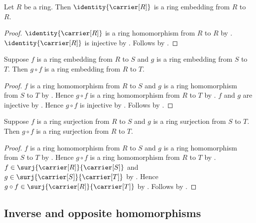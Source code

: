 \begin{proposition}\label{identity_ring_embedding}
    Let $R$ be a ring.
    Then $\identity{\carrier[R]}$ is a ring embedding from $R$ to $R$.
\end{proposition}
\begin{proof}
    $\identity{\carrier[R]}$ is a ring homomorphism from $R$ to $R$ by
        .
    $\identity{\carrier[R]}$ is injective by
        .
    Follows by .
\end{proof}

\begin{theorem}\label{ring_embedding_composition}
    Suppose $f$ is a ring embedding from $R$ to $S$ and
        $g$ is a ring embedding from $S$ to $T$.
    Then $g\circ f$ is a ring embedding from $R$ to $T$.
\end{theorem}
\begin{proof}
    $f$ is a ring homomorphism from $R$ to $S$ and
        $g$ is a ring homomorphism from $S$ to $T$ by
        .
    Hence $g\circ f$ is a ring homomorphism from $R$ to $T$ by
        .
    $f$ and $g$ are injective by .
    Hence $g\circ f$ is injective by .
    Follows by .
\end{proof}

\begin{theorem}\label{ring_surjection_composition}
    Suppose $f$ is a ring surjection from $R$ to $S$ and
        $g$ is a ring surjection from $S$ to $T$.
    Then $g\circ f$ is a ring surjection from $R$ to $T$.
\end{theorem}
\begin{proof}
    $f$ is a ring homomorphism from $R$ to $S$ and
        $g$ is a ring homomorphism from $S$ to $T$ by
        .
    Hence $g\circ f$ is a ring homomorphism from $R$ to $T$ by
        .
    $f\in\surj{\carrier[R]}{\carrier[S]}$ and
        $g\in\surj{\carrier[S]}{\carrier[T]}$ by
        .
    Hence $g\circ f\in\surj{\carrier[R]}{\carrier[T]}$ by
        .
    Follows by .
\end{proof}

\subsection{Inverse and opposite homomorphisms}

